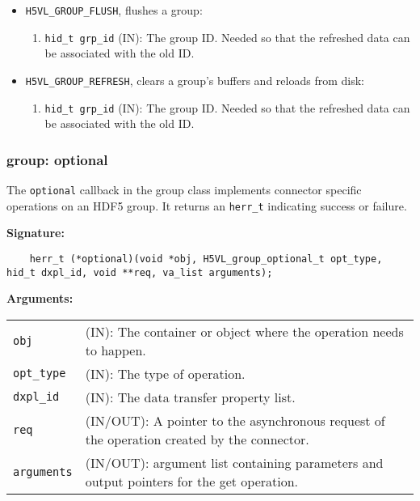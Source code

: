 \begin{itemize}
\item \texttt{H5VL\_GROUP\_FLUSH}, flushes a group:
  \begin{enumerate}
  \item \texttt{hid\_t grp\_id} (IN): The group ID. Needed so that the refreshed data can be associated with the old ID. 
  \end{enumerate}
\item \texttt{H5VL\_GROUP\_REFRESH}, clears a group's buffers and reloads from disk:
  \begin{enumerate}
  \item \texttt{hid\_t grp\_id} (IN): The group ID. Needed so that the refreshed data can be associated with the old ID. 
  \end{enumerate}
\end{itemize}

\subsubsection{group: optional}
The \texttt{optional} callback in the group class implements connector specific operations on an HDF5 group. It returns an \texttt{herr\_t} indicating success or failure. \bigskip

\begin{mdframed}[style=bgbox]
\textbf{Signature:}
\begin{lstlisting}
    herr_t (*optional)(void *obj, H5VL_group_optional_t opt_type, hid_t dxpl_id, void **req, va_list arguments);
\end{lstlisting}

\textbf{Arguments:}\\
\begin{tabular}{l p{13.5cm}}
  \texttt{obj} & (IN): The container or object where the operation needs to happen.\\
  \texttt{opt\_type} & (IN): The type of operation.\\
  \texttt{dxpl\_id} & (IN): The data transfer property list.\\
  \texttt{req} & (IN/OUT): A pointer to the asynchronous request of the operation created by the connector.\\
  \texttt{arguments} & (IN/OUT): argument list containing parameters and output pointers for the get operation. \\
\end{tabular}
\end{mdframed}

